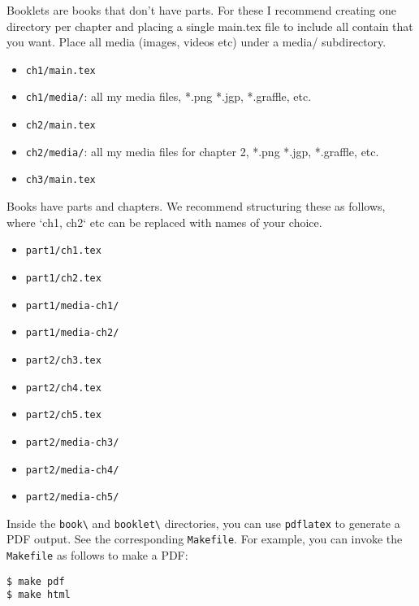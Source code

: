 \begin{gram}[Booklets]
 
 Booklets are books that don't have parts. For these  I recommend creating one directory per chapter and placing a single main.tex file to include all contain that you want.  Place all media (images, videos etc) under a media/ subdirectory. 
\begin{itemize}  
\item \lstinline`ch1/main.tex`
\item \lstinline`ch1/media/`: all my media files, *.png *.jgp, *.graffle, etc.
\item \lstinline`ch2/main.tex`
\item \lstinline`ch2/media/`: all my media files for chapter 2, *.png *.jgp, *.graffle, etc.
\item \lstinline`ch3/main.tex`
\end{itemize}
\end{gram}

\begin{gram}[Books]

Books have parts and chapters. We recommend structuring these as follows, where `ch1, ch2` etc can be replaced with names of your choice.
%
\begin{itemize}
\item \lstinline`part1/ch1.tex`
\item \lstinline`part1/ch2.tex`
\item \lstinline`part1/media-ch1/`
\item \lstinline`part1/media-ch2/`
\item \lstinline`part2/ch3.tex`
\item \lstinline`part2/ch4.tex`
\item \lstinline`part2/ch5.tex`
\item \lstinline`part2/media-ch3/`
\item \lstinline`part2/media-ch4/`
\item \lstinline`part2/media-ch5/`
\end{itemize}
   
\end{gram}


\begin{gram}
Inside the \lstinline`book\` and \lstinline`booklet\` directories, 
you can use \lstinline`pdflatex` to generate a PDF output.  See the corresponding \lstinline`Makefile`.
%
For example, you can  invoke the \lstinline`Makefile` as follows to make a PDF:
\begin{lstlisting}
$ make pdf
$ make html
\end{lstlisting}
\end{gram}


